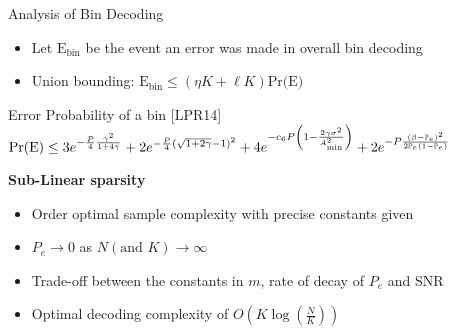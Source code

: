 \begin{frame}{Analysis of Bin Decoding}
\begin{itemize}
\item Let $\text{E}_{\text{bin}}$ be the event an error was made in overall bin decoding
\item Union bounding: $\text{E}_{\text{bin}}\leq (\eta K+\ell K)\text{Pr(E)}$
\end{itemize}
\begin{block}{Error Probability of a bin [LPR14]}
$\text{Pr(E)}\leq 3e^{-\frac{P}{4}\frac{\gamma^2}{1+4 \gamma}}+2e^{-\frac{P}{4}(\sqrt{1+2\gamma}-1)^2}+4e^{-c_6 P\left(1-\frac{2\gamma\sigma^2}{A^{2}_{\text{min}}}\right)}+2e^{-P\frac{\left(\beta-\mathbb{P}_{e}\right)^2}{2\mathbb{P}_{e}(1-\mathbb{P}_{e})}}$
\end{block}
\vspace{2ex}
\begin{description}
    \item[\textbf{Sub-Linear sparsity}]
\end{description}
\begin{itemize}
\item Order optimal sample complexity with precise constants given
\item $P_e\rightarrow 0$ as $N (\text{and } K)\rightarrow \infty$
\item Trade-off between the constants in $m$, rate of decay of  $P_e$ and SNR
\item Optimal decoding complexity of $O\left(K\log\left(\frac{N}{K}\right)\right)$
\end{itemize}
\end{frame}

